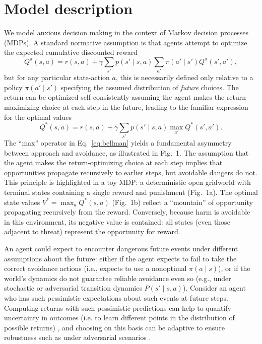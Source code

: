 \documentclass[11pt]{article} %
\begin{document}

\section{Model description}

We model anxious decision making in the context of Markov decision processes (MDPs). A standard normative assumption is that agents attempt to optimize the expected cumulative discounted reward
\begin{equation*}
Q^\pi(s,a) = r(s,a) + \gamma \sum_{s'} p(s' \mid s,a) \sum_{a'} \pi(a' \mid s') Q^\pi(s',a'),
\end{equation*}
but for any particular state-action $a$, this is necessarily defined only relative to a policy $\pi(a' \mid s')$ specifying the assumed distribution of \emph{future} choices. The return can be optimized self-consistently assuming the agent makes the return-maximizing choice at each step in the future, leading to the familiar expression for the optimal values
\begin{equation}\label{eq:bellman}
 Q^*(s,a) = r(s,a) + \gamma \sum_{s'} p(s' \mid s,a) \max_{a'} Q^*(s',a').
\end{equation}
The ``max'' operator in Eq.~\ref{eq:bellman} yields a fundamental asymmetry between approach and avoidance, as illustrated in Fig.~1. The assumption that the agent makes the return-optimizing choice at each step implies that opportunities propagate recursively to earlier steps, but avoidable dangers do not. This principle is highlighted in a toy MDP: a deterministic open gridworld with terminal states containing a single reward and punishment (Fig.~1a). The optimal state values $V^* = \max_a Q^*(s,a)$ (Fig.~1b) reflect a ``mountain'' of opportunity propagating recursively from the reward. Conversely, because harm is avoidable in this environment, its negative value is contained: all states (even those adjacent to threat) represent the opportunity for reward.

An agent could expect to encounter dangerous future events under different assumptions about the future: either if the agent expects to fail to take the correct avoidance actions (i.e., expects to use a nonoptimal $\pi(a \mid s)$), or if the world's dynamics do not guarantee reliable avoidance even so (e.g., under stochastic or adversarial transition dynamics $P(s' \mid s,a)$). Consider an agent who has such pessimistic expectations about such events at future steps. Computing returns with such pessimistic predictions can help to quantify uncertainty in outcomes (i.e. to learn different points in the distribution of possible returns) \cite{deepmindstuff}, and choosing on this basis can be adaptive to ensure robustness such as under adversarial scenarios \cite{Garcia2015}. 
\end{document}
